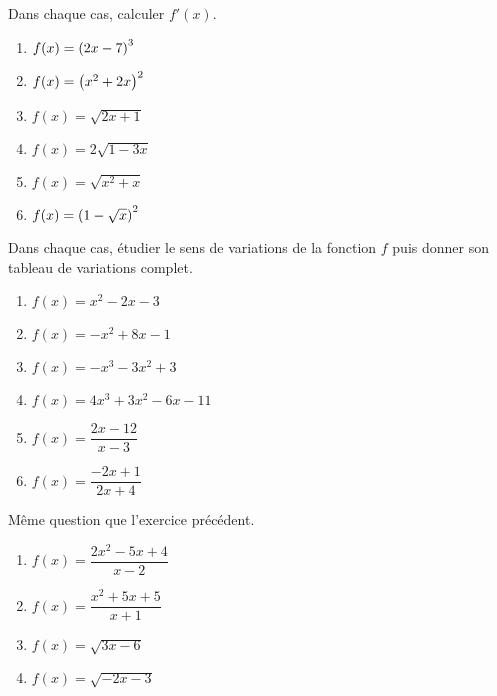 \begin{exercice}
Dans chaque cas, calculer $ f'(x) $.
\begin{enumerate}
\item $ f(x)= \left(2x-7\right)^{3}$
\item $ f(x)=\left(x^{2}+2x\right)^{2} $  
  
\item $ f(x)=\sqrt{2x+1} $ 
\item $ f(x)=2\sqrt{1-3x} $
\item $ f(x)=\sqrt{x^{2}+x} $

\item  $ f(x)=\left(1- \sqrt{x}\right)^{2} $                                                 
\end{enumerate}

  \end{exercice}
  
 
  
  \begin{exercice}
Dans chaque cas, étudier le sens de variations de la fonction $ f $ puis donner son tableau de variations complet.
\begin{enumerate}
\item $ f(x)= x^{2}-2x-3$  
\item $ f(x)= -x^{2}+8x-1$ 
\item $ f(x)=-x^{3}-3x^{2} +3$ 
\item $ f(x)=4x^{3} +3x^{2}-6x-11$ 
\item $ f(x)= \dfrac{2x-12}{x-3} $
\item $ f(x)= \dfrac{-2x+1}{2x+4} $


\end{enumerate}

  \end{exercice}
  \begin{exercice}
Même question que l'exercice précédent.
\begin{enumerate}
\item $ f(x)=\dfrac{2x^{2}-5x+4}{x-2} $  
\item $ f(x)= \dfrac{x^{2}+5x+5}{x+1}$                                                   
\item $ f(x)=\sqrt{3x-6} $ 
\item $ f(x)=\sqrt{-2x-3} $


\end{enumerate}

  \end{exercice}
  



